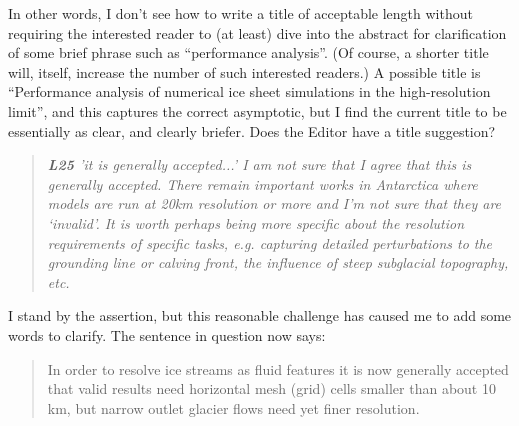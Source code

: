 \documentclass[letterpaper,final,12pt,reqno]{amsart}
\newenvironment{review}%
{\bigskip \par \begin{quote} \selectfont \sl}%
{\end{quote}}
\begin{document}
\medskip \noindent In other words, I don't see how to write a title of acceptable length without requiring the interested reader to (at least) dive into the abstract for clarification of some brief phrase such as ``performance analysis''.  (Of course, a shorter title will, itself, increase the number of such interested readers.)  A possible title is ``Performance analysis of numerical ice sheet simulations in the high-resolution limit'', and this captures the correct asymptotic, but I find the current title to be essentially as clear, and clearly briefer.  Does the Editor have a title suggestion?

\begin{review}
\textbf{L25} 'it is generally accepted...'  I am not sure that I agree that this is generally accepted.  There remain important works in Antarctica where models are run at 20km resolution or more and I’m not sure that they are ‘invalid’.  It is worth perhaps being more specific about the resolution requirements of specific tasks, e.g. capturing detailed perturbations to the grounding line or calving front, the influence of steep subglacial topography, etc.
\end{review}

\noindent I stand by the assertion, but this reasonable challenge has caused me to add some words to clarify.  The sentence in question now says:

\begin{quote}  In order to resolve ice streams as fluid features it is now generally accepted that valid results need horizontal mesh (grid) cells smaller than about 10 km, but narrow outlet glacier flows need yet finer resolution.\end{quote}
\end{document}
